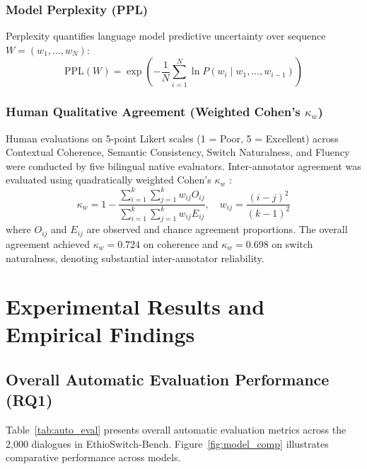 \documentclass[11pt,a4paper]{article}
\begin{document}
\subsubsection{Model Perplexity (PPL)}
Perplexity quantifies language model predictive uncertainty over sequence $W = (w_1, \dots, w_N)$:
\begin{equation}
    \text{PPL}(W) = \exp\left( - \frac{1}{N} \sum_{i=1}^{N} \ln P(w_i \mid w_1, \dots, w_{i-1}) \right)
\end{equation}

\subsubsection{Human Qualitative Agreement (Weighted Cohen's \texorpdfstring{$\kappa_w$}{kappa\_w})}
Human evaluations on 5-point Likert scales (1 = Poor, 5 = Excellent) across Contextual Coherence, Semantic Consistency, Switch Naturalness, and Fluency were conducted by five bilingual native evaluators. Inter-annotator agreement was evaluated using quadratically weighted Cohen's $\kappa_w$ \cite{cohen1968weighted}:
\begin{equation}
    \kappa_w = 1 - \frac{\sum_{i=1}^{k} \sum_{j=1}^{k} w_{ij} O_{ij}}{\sum_{i=1}^{k} \sum_{j=1}^{k} w_{ij} E_{ij}}, \quad w_{ij} = \frac{(i - j)^2}{(k - 1)^2}
\end{equation}
where $O_{ij}$ and $E_{ij}$ are observed and chance agreement proportions. The overall agreement achieved $\kappa_w = 0.724$ on coherence and $\kappa_w = 0.698$ on switch naturalness, denoting substantial inter-annotator reliability.

\section{Experimental Results and Empirical Findings}

\subsection{Overall Automatic Evaluation Performance (RQ1)}
Table~\ref{tab:auto_eval} presents overall automatic evaluation metrics across the 2,000 dialogues in EthioSwitch-Bench. Figure~\ref{fig:model_comp} illustrates comparative performance across models.
\end{document}
